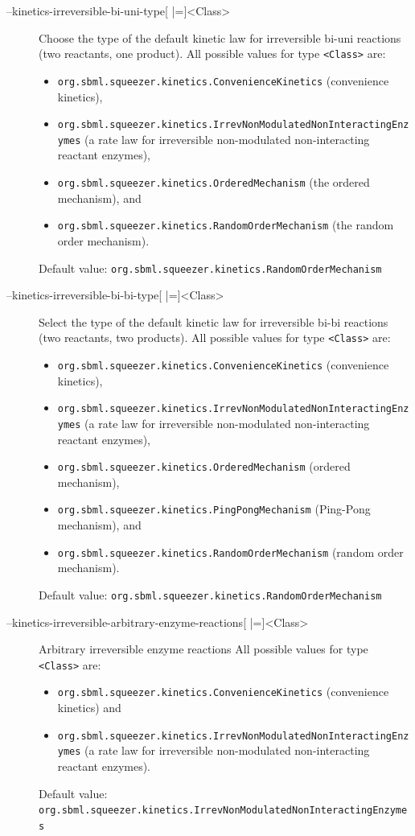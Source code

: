 \begin{description}
\item[--kinetics-irreversible-bi-uni-type{[} |={]}<Class>]
  Choose the type of the default kinetic law for irreversible bi-uni
  reactions (two reactants, one product).
  All possible values for type \texttt{<Class>} are:
  \begin{itemize}
  \item\texttt{org.sbml.squeezer.kinetics.ConvenienceKinetics} (convenience kinetics),
  \item\texttt{org.sbml.squeezer.kinetics.IrrevNonModulatedNonInteractingEnzymes} (a rate law for irreversible non-modulated non-interacting reactant enzymes),
  \item\texttt{org.sbml.squeezer.kinetics.OrderedMechanism} (the ordered mechanism), and
  \item\texttt{org.sbml.squeezer.kinetics.RandomOrderMechanism} (the random order mechanism).
  \end{itemize}
  Default value: \texttt{org.sbml.squeezer.kinetics.RandomOrderMechanism}

\item[--kinetics-irreversible-bi-bi-type{[} |={]}<Class>]
  Select the type of the default kinetic law for irreversible bi-bi
  reactions (two reactants, two products).
  All possible values for type \texttt{<Class>} are:
  \begin{itemize}
  \item\texttt{org.sbml.squeezer.kinetics.ConvenienceKinetics} (convenience kinetics),
  \item\texttt{org.sbml.squeezer.kinetics.IrrevNonModulatedNonInteractingEnzymes} (a rate law for irreversible non-modulated non-interacting reactant enzymes),
  \item\texttt{org.sbml.squeezer.kinetics.OrderedMechanism} (ordered mechanism),
  \item\texttt{org.sbml.squeezer.kinetics.PingPongMechanism} (Ping-Pong mechanism), and
  \item\texttt{org.sbml.squeezer.kinetics.RandomOrderMechanism} (random order mechanism).
  \end{itemize}
  Default value: \texttt{org.sbml.squeezer.kinetics.RandomOrderMechanism}

\item[--kinetics-irreversible-arbitrary-enzyme-reactions{[} |={]}<Class>]
  Arbitrary irreversible enzyme reactions
  All possible values for type \texttt{<Class>} are:
  \begin{itemize}
  \item\texttt{org.sbml.squeezer.kinetics.ConvenienceKinetics} (convenience kinetics) and
  \item\texttt{org.sbml.squeezer.kinetics.IrrevNonModulatedNonInteractingEnzymes} (a rate law for irreversible non-modulated non-interacting reactant enzymes).
  \end{itemize}
  Default value:
  \texttt{org.sbml.squeezer.kinetics.IrrevNonModulatedNonInteractingEnzymes}
\end{description}

